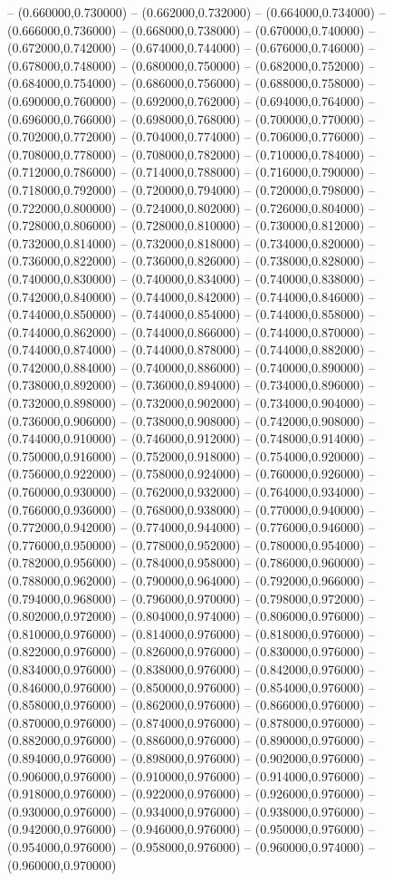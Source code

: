 -- (0.660000,0.730000) -- (0.662000,0.732000) -- (0.664000,0.734000) -- (0.666000,0.736000) -- (0.668000,0.738000) -- (0.670000,0.740000) -- (0.672000,0.742000) -- (0.674000,0.744000) -- (0.676000,0.746000) -- (0.678000,0.748000) -- (0.680000,0.750000) -- (0.682000,0.752000) -- (0.684000,0.754000) -- (0.686000,0.756000) -- (0.688000,0.758000) -- (0.690000,0.760000) -- (0.692000,0.762000) -- (0.694000,0.764000) -- (0.696000,0.766000) -- (0.698000,0.768000) -- (0.700000,0.770000) -- (0.702000,0.772000) -- (0.704000,0.774000) -- (0.706000,0.776000) -- (0.708000,0.778000) -- (0.708000,0.782000) -- (0.710000,0.784000) -- (0.712000,0.786000) -- (0.714000,0.788000) -- (0.716000,0.790000) -- (0.718000,0.792000) -- (0.720000,0.794000) -- (0.720000,0.798000) -- (0.722000,0.800000) -- (0.724000,0.802000) -- (0.726000,0.804000) -- (0.728000,0.806000) -- (0.728000,0.810000) -- (0.730000,0.812000) -- (0.732000,0.814000) -- (0.732000,0.818000) -- (0.734000,0.820000) -- (0.736000,0.822000) -- (0.736000,0.826000) -- (0.738000,0.828000) -- (0.740000,0.830000) -- (0.740000,0.834000) -- (0.740000,0.838000) -- (0.742000,0.840000) -- (0.744000,0.842000) -- (0.744000,0.846000) -- (0.744000,0.850000) -- (0.744000,0.854000) -- (0.744000,0.858000) -- (0.744000,0.862000) -- (0.744000,0.866000) -- (0.744000,0.870000) -- (0.744000,0.874000) -- (0.744000,0.878000) -- (0.744000,0.882000) -- (0.742000,0.884000) -- (0.740000,0.886000) -- (0.740000,0.890000) -- (0.738000,0.892000) -- (0.736000,0.894000) -- (0.734000,0.896000) -- (0.732000,0.898000) -- (0.732000,0.902000) -- (0.734000,0.904000) -- (0.736000,0.906000) -- (0.738000,0.908000) -- (0.742000,0.908000) -- (0.744000,0.910000) -- (0.746000,0.912000) -- (0.748000,0.914000) -- (0.750000,0.916000) -- (0.752000,0.918000) -- (0.754000,0.920000) -- (0.756000,0.922000) -- (0.758000,0.924000) -- (0.760000,0.926000) -- (0.760000,0.930000) -- (0.762000,0.932000) -- (0.764000,0.934000) -- (0.766000,0.936000) -- (0.768000,0.938000) -- (0.770000,0.940000) -- (0.772000,0.942000) -- (0.774000,0.944000) -- (0.776000,0.946000) -- (0.776000,0.950000) -- (0.778000,0.952000) -- (0.780000,0.954000) -- (0.782000,0.956000) -- (0.784000,0.958000) -- (0.786000,0.960000) -- (0.788000,0.962000) -- (0.790000,0.964000) -- (0.792000,0.966000) -- (0.794000,0.968000) -- (0.796000,0.970000) -- (0.798000,0.972000) -- (0.802000,0.972000) -- (0.804000,0.974000) -- (0.806000,0.976000) -- (0.810000,0.976000) -- (0.814000,0.976000) -- (0.818000,0.976000) -- (0.822000,0.976000) -- (0.826000,0.976000) -- (0.830000,0.976000) -- (0.834000,0.976000) -- (0.838000,0.976000) -- (0.842000,0.976000) -- (0.846000,0.976000) -- (0.850000,0.976000) -- (0.854000,0.976000) -- (0.858000,0.976000) -- (0.862000,0.976000) -- (0.866000,0.976000) -- (0.870000,0.976000) -- (0.874000,0.976000) -- (0.878000,0.976000) -- (0.882000,0.976000) -- (0.886000,0.976000) -- (0.890000,0.976000) -- (0.894000,0.976000) -- (0.898000,0.976000) -- (0.902000,0.976000) -- (0.906000,0.976000) -- (0.910000,0.976000) -- (0.914000,0.976000) -- (0.918000,0.976000) -- (0.922000,0.976000) -- (0.926000,0.976000) -- (0.930000,0.976000) -- (0.934000,0.976000) -- (0.938000,0.976000) -- (0.942000,0.976000) -- (0.946000,0.976000) -- (0.950000,0.976000) -- (0.954000,0.976000) -- (0.958000,0.976000) -- (0.960000,0.974000) -- (0.960000,0.970000) 